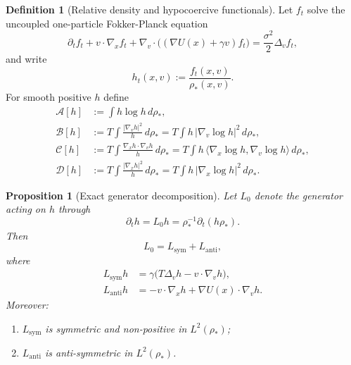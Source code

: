\documentclass[11pt]{article}
\newtheorem{proposition}[theorem]{Proposition}
\theoremstyle{definition}
\newtheorem{definition}[theorem]{Definition}
\theoremstyle{remark}
\begin{document}
\begin{definition}[Relative density and hypocoercive functionals]\label{def:functionals}
Let $f_t$ solve the uncoupled one-particle Fokker-Planck equation
\[
\partial_t f_t
+v\cdot \nabla_x f_t
+\nabla_v\cdot\bigl((\nabla U(x)+\gamma v)f_t\bigr)
=\frac{\sigma^2}{2}\Delta_v f_t,
\]
and write
\[
h_t(x,v):=\frac{f_t(x,v)}{\rho_*(x,v)}.
\]
For smooth positive $h$ define
\begin{align}
\mathcal A[h]
&:=
\int h\log h\,d\rho_*,
\label{eq:A-def}\\
\mathcal B[h]
&:=
T\int \frac{|\nabla_v h|^2}{h}\,d\rho_*
=
T\int h\,|\nabla_v \log h|^2\,d\rho_*,
\label{eq:B-def}\\
\mathcal C[h]
&:=
T\int \frac{\nabla_x h\cdot \nabla_v h}{h}\,d\rho_*
=
T\int h\,\langle \nabla_x\log h,\nabla_v\log h\rangle\,d\rho_*,
\label{eq:C-def}\\
\mathcal D[h]
&:=
T\int \frac{|\nabla_x h|^2}{h}\,d\rho_*
=
T\int h\,|\nabla_x \log h|^2\,d\rho_*.
\label{eq:D-def}
\end{align}
\end{definition}

\begin{proposition}[Exact generator decomposition]\label{prop:generator}
Let $L_0$ denote the generator acting on $h$ through
\[
\partial_t h=L_0 h=\rho_*^{-1}\partial_t(h\rho_*).
\]
Then
\[
L_0=L_{\mathrm{sym}}+L_{\mathrm{anti}},
\]
where
\begin{align}
L_{\mathrm{sym}}h
&=
\gamma\bigl(T\Delta_v h-v\cdot \nabla_v h\bigr),
\label{eq:Lsym}\\
L_{\mathrm{anti}}h
&=
-v\cdot \nabla_x h+\nabla U(x)\cdot \nabla_v h.
\label{eq:Lanti}
\end{align}
Moreover:
\begin{enumerate}[label=\textnormal{(\roman*)},leftmargin=1.5em]
\item $L_{\mathrm{sym}}$ is symmetric and non-positive in $L^2(\rho_*)$;
\item $L_{\mathrm{anti}}$ is anti-symmetric in $L^2(\rho_*)$.
\end{enumerate}
\end{proposition}
\end{document}
